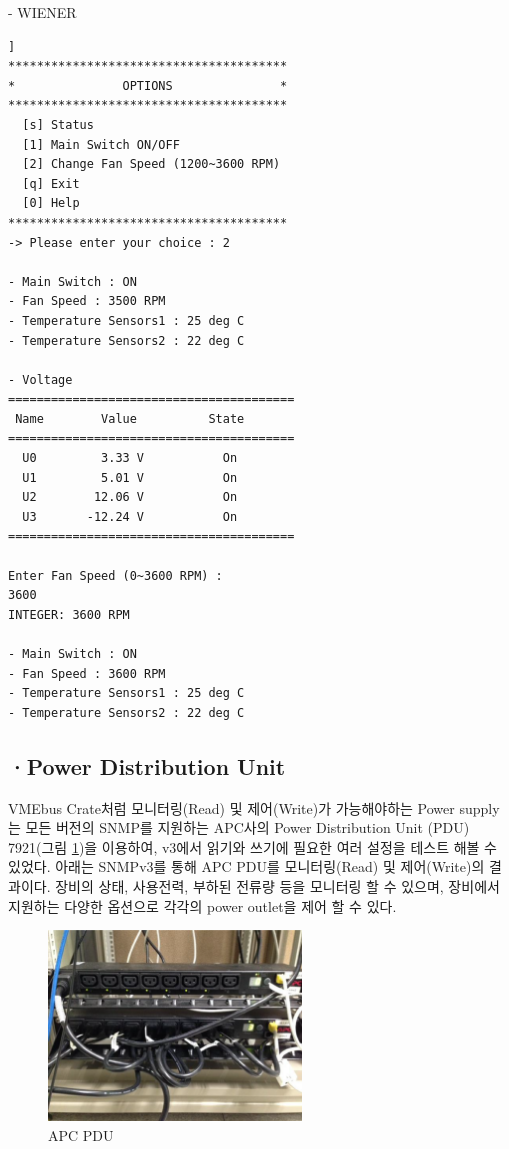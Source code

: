 \documentclass[11pt
  , a4paper
  , article
  , oneside
]{memoir}
\begin{document}
\vspace{5mm}
- WIENER
\begin{lstlisting}[style=termstyle, caption=Wiener Crate 모니터링 및 제어결과]]
***************************************
*               OPTIONS               *
***************************************
  [s] Status                           
  [1] Main Switch ON/OFF               
  [2] Change Fan Speed (1200~3600 RPM) 
  [q] Exit                             
  [0] Help                             
***************************************
-> Please enter your choice : 2

- Main Switch : ON
- Fan Speed : 3500 RPM
- Temperature Sensors1 : 25 deg C
- Temperature Sensors2 : 22 deg C

- Voltage
========================================
 Name        Value          State
========================================
  U0         3.33 V           On
  U1         5.01 V           On
  U2        12.06 V           On
  U3       -12.24 V           On
========================================

Enter Fan Speed (0~3600 RPM) : 
3600
INTEGER: 3600 RPM

- Main Switch : ON
- Fan Speed : 3600 RPM
- Temperature Sensors1 : 25 deg C
- Temperature Sensors2 : 22 deg C
\end{lstlisting}


\subsection{·Power Distribution Unit}
VMEbus Crate처럼 모니터링(Read) 및 제어(Write)가 가능해야하는 Power supply는 모든 버전의 SNMP를 지원하는 APC사의 Power Distribution Unit (PDU) 7921(그림 \ref{fig:apc_pdu})을 이용하여, v3에서 읽기와 쓰기에 필요한 여러 설정을 테스트 해볼 수 있었다. 아래는 SNMPv3를 통해 APC PDU를 모니터링(Read) 및 제어(Write)의 결과이다. 장비의 상태, 사용전력, 부하된 전류량 등을 모니터링 할 수 있으며, 장비에서 지원하는 다양한 옵션으로 각각의 power outlet을 제어 할 수 있다.

\begin{figure}[h]
  \centering
  \includegraphics[width=0.6\textwidth]{./images/apc_pdu.eps}
  \caption{APC PDU}
  \label{fig:apc_pdu}   
\end{figure}
\end{document}
